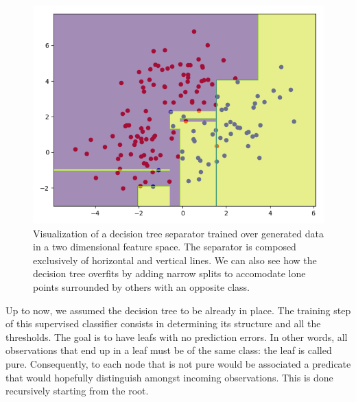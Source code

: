         \begin{figure}[htb]
            \centering
            \includegraphics[width=.5\textwidth]{images/related_work/decision_tree_separator}
            \caption[
                Visualization of a decision tree separator trained over generated data in a two dimensional feature space.
            ]{
                \label{fig::decision_tree_separator}
                Visualization of a decision tree separator trained over generated data in a two dimensional feature space.
                The separator is composed exclusively of horizontal and vertical lines.
                We can also see how the decision tree overfits by adding narrow splits to accomodate lone points surrounded by others with an opposite class.
            }
        \end{figure}

        Up to now, we assumed the decision tree to be already in place.
        The training step of this supervised classifier consists in determining its structure and all the thresholds.
        The goal is to have leafs with no prediction errors.
        In other words, all observations that end up in a leaf must be of the same class: the leaf is called pure.
        Consequently, to each node that is not pure would be associated a predicate that would hopefully distinguish amongst incoming observations.
        This is done recursively starting from the root.\\

